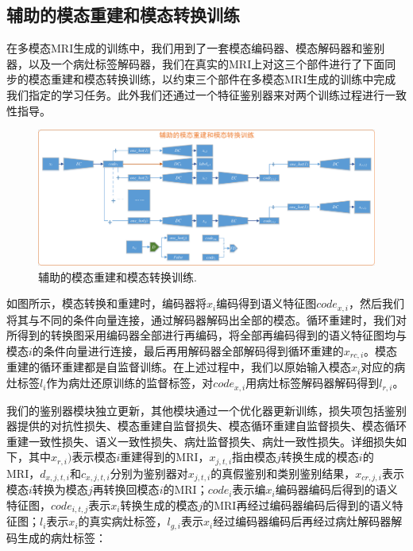 \documentclass[letterpaper]{article} %
\begin{document}
\subsection{辅助的模态重建和模态转换训练}
在多模态MRI生成的训练中，我们用到了一套模态编码器、模态解码器和鉴别器，以及一个病灶标签解码器，我们在真实的MRI上对这三个部件进行了下面同步的模态重建和模态转换训练，以约束三个部件在多模态MRI生成的训练中完成我们指定的学习任务。此外我们还通过一个特征鉴别器来对两个训练过程进行一致性指导。

\begin{figure}
	\centering
	\includegraphics[width=0.98\linewidth]{figures/trans_train}
	\caption{辅助的模态重建和模态转换训练.}
	\label{trans_train}
\end{figure}

如图所示，模态转换和重建时，编码器将$x_i$编码得到语义特征图$code_{x,i}$，然后我们将其与不同的条件向量连接，通过解码器解码出全部的模态。循环重建时，我们对所得到的转换图采用编码器全部进行再编码，将全部再编码得到的语义特征图均与模态$i$的条件向量进行连接，最后再用解码器全部解码得到循环重建的$x_{rc,i}$。模态重建的循环重建都是自监督训练。在上述过程中，我们以原始输入模态$x_i$对应的病灶标签$l_i$作为病灶还原训练的监督标签，对$code_{x,i}$用病灶标签解码器解码得到$l_{r,i}$。

我们的鉴别器模块独立更新，其他模块通过一个优化器更新训练，损失项包括鉴别器提供的对抗性损失、模态重建自监督损失、模态循环重建自监督损失、模态循环重建一致性损失、语义一致性损失、病灶监督损失、病灶一致性损失。详细损失如下，其中$x_{r,i})$表示模态$i$重建得到的MRI，$x_{j,t,i}$指由模态$j$转换生成的模态$i$的MRI，$d_{x,j,t,i}$和$c_{x,j,t,i}$分别为鉴别器对$x_{j,t,i}$的真假鉴别和类别鉴别结果，$x_{cr,j,i}$表示模态$i$转换为模态$j$再转换回模态$i$的MRI；$code_i$表示编$x_i$编码器编码后得到的语义特征图，$code_{i,t,j}$表示$x_i$转换生成的模态$j$的MRI再经过编码器编码后得到的语义特征图；$l_i$表示$x_i$的真实病灶标签，$l_{g,i}$表示$x_i$经过编码器编码后再经过病灶解码器解码生成的病灶标签：
\end{document}
